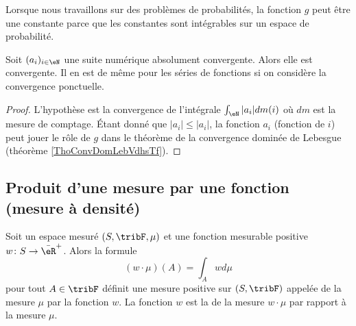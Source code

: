 \begin{remark}
    Lorsque nous travaillons sur des problèmes de probabilités, la fonction \( g\) peut être une constante parce que les constantes sont intégrables sur un espace de probabilité.
\end{remark}

\begin{corollary}       \label{CorCvAbsNormwEZdRc}
    Soit \( (a_i)_{i\in \eN}\) une suite numérique absolument convergente. Alors elle est convergente. Il en est de même pour les séries de fonctions si on considère la convergence ponctuelle.
\end{corollary}

\begin{proof}
    L'hypothèse est la convergence de l'intégrale \( \int_{\eN}| a_i |dm(i)\) où \( dm\) est la mesure de comptage. Étant donné que \( | a_i |\leq | a_i |\), la fonction \( a_i\) (fonction de \( i\)) peut jouer le rôle de \( g\) dans le théorème de la convergence dominée de Lebesgue (théorème \ref{ThoConvDomLebVdhsTf}).
\end{proof}

\subsection{Produit d'une mesure par une fonction (mesure à densité)}

\begin{propositionDef}\label{PropooVXPMooGSkyBo}
    Soit un espace mesuré \( (S,\tribF,\mu)\) et une fonction mesurable positive \( w\colon S\to \bar\eR^+\). Alors la formule
    \begin{equation}
        (w\cdot \mu)(A)=\int_Awd\mu
    \end{equation}
    pour tout \( A\in \tribF\) définit une mesure positive sur \( (S,\tribF)\) appelée  de la mesure \( \mu\) par la fonction \( w\). La fonction \( w\) est la  de la mesure \( w\cdot \mu\) par rapport à la mesure \( \mu\).
\end{propositionDef}

